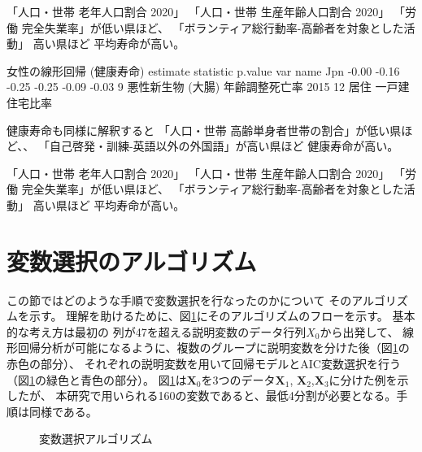 \documentclass[a4j,11pt,mc]{jreport}
\begin{document}
「人口・世帯 老年人口割合 2020」
「人口・世帯 生産年齢人口割合 2020」
「労働 完全失業率」が低い県ほど、
「ボランティア総行動率-高齢者を対象とした活動」
高い県ほど
平均寿命が高い。

女性の線形回帰 (健康寿命)
estimate statistic p.value
 var name Jpn
-0.00 -0.16 -0.25 -0.25 -0.09 -0.03
9 悪性新生物 (大腸) 年齢調整死亡率 2015
12 居住 一戸建住宅比率


健康寿命も同様に解釈すると
「人口・世帯 高齢単身者世帯の割合」が低い県ほど、、
「自己啓発・訓練-英語以外の外国語」が高い県ほど
健康寿命が高い。



「人口・世帯 老年人口割合 2020」
「人口・世帯 生産年齢人口割合 2020」
「労働 完全失業率」が低い県ほど、
「ボランティア総行動率-高齢者を対象とした活動」
高い県ほど
平均寿命が高い。




\section{変数選択のアルゴリズム}




この節ではどのような手順で変数選択を行なったのかについて
そのアルゴリズムを示す。
理解を助けるために、図\ref{Varsel}にそのアルゴリズムのフローを示す。
基本的な考え方は最初の
列が47を超える説明変数のデータ行列$X_0$から出発して、
線形回帰分析が可能になるように、複数のグループに説明変数を分けた後（図\ref{Varsel}の赤色の部分）、
それぞれの説明変数を用いて回帰モデルとAIC変数選択を行う（図\ref{Varsel}の緑色と青色の部分）。
図\ref{Varsel}は$\bm{X}_0$を3つのデータ$\bm{X}_1$, $\bm{X}_2$,$\bm{X}_3$に分けた例を示したが、
本研究で用いられる160の変数であると、最低4分割が必要となる。手順は同様である。



 \begin{figure}
\centering
	\caption{変数選択アルゴリズム}
	\label{Varsel}
 \end{figure}





%
%
%
%
%
%
%
\end{document}
